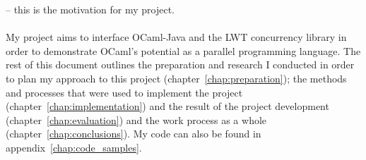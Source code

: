 \documentclass[12pt,twoside,notitlepage]{report}
\begin{document}
-- this is the motivation for my project. 
\hfill\\
\hfill\\
%
%
My project aims to interface OCaml-Java and the LWT concurrency library in order to demonstrate OCaml's potential as a parallel programming language. The rest of this document outlines the preparation and research I conducted in order
to plan my approach to this project (chapter~\ref{chap:preparation}); the methods and processes that were used to implement the project (chapter~\ref{chap:implementation}) and the result of the project development
(chapter~\ref{chap:evaluation}) and the work process as a whole (chapter~\ref{chap:conclusions}). My code can also be found in appendix~\ref{chap:code_samples}.
\end{document}
